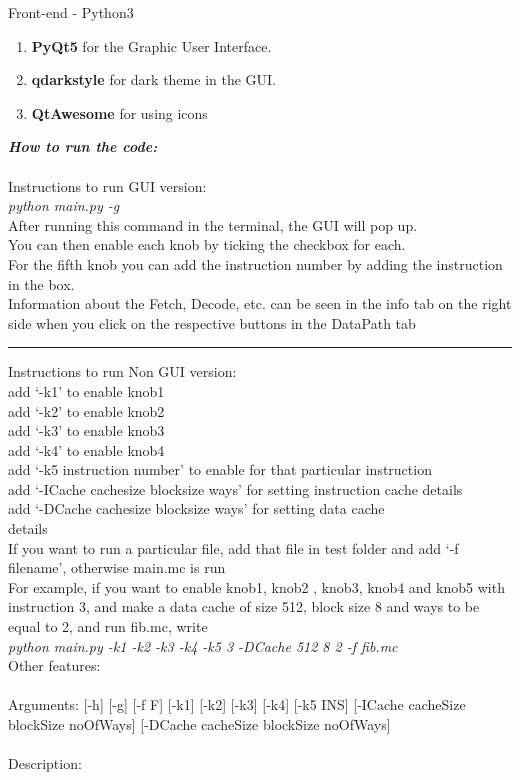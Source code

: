 \documentclass{article}
\begin{document}
Front-end - Python3
\begin{enumerate}
  \item {\bf PyQt5} for the Graphic User Interface.
  \item {\bf qdarkstyle} for dark theme in the GUI.
  \item {\bf QtAwesome} for using icons
\end{enumerate}
\newpage
\textsl{\textbf{How to run the code:}}\\\\
\textsf{Instructions to run GUI version:}\\
\textsl{python main.py -g}\\
After running this command in the terminal, the GUI will pop up.\\
You can then enable each knob by ticking the checkbox for each.\\
For the fifth knob you can add the instruction number by adding the instruction in the box.\\
Information about the Fetch, Decode, etc. can be seen in the info tab on the right side when you click on the respective buttons in the DataPath tab
\par\noindent\rule{\textwidth}{0.4pt}
\textsf{Instructions to run Non GUI version:}\\
add `-k1' to enable knob1\\
add `-k2' to enable knob2\\
add `-k3' to enable knob3\\
add `-k4' to enable knob4\\
add `-k5 instruction number' to enable for that particular instruction\\
add `-ICache cachesize blocksize ways' for setting instruction cache details\\
add `-DCache cachesize blocksize ways' for setting data cache \\details\\
If you want to run a particular file, add that file in test folder and add `-f filename', otherwise main.mc is run\\
For example, if you want to enable knob1, knob2 , knob3, knob4 and knob5 with instruction 3, and make a data cache of size 512, block size 8 and ways to be equal to 2, and run fib.mc, write\\
\textsl{python main.py -k1 -k2 -k3 -k4 -k5 3 -DCache 512 8 2 -f fib.mc}\\
\newpage
\noindent
\textsf{Other features:}\\
\\
Arguments: [-h] [-g] [-f F] [-k1] [-k2] [-k3] [-k4] [-k5 INS] [-ICache cacheSize blockSize noOfWays] [-DCache cacheSize blockSize noOfWays]\\\\
\textsf{Description:}\\
\end{document}
